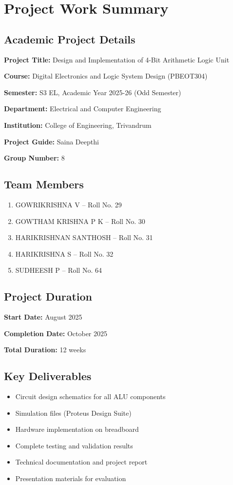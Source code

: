 \chapter*{Project Work Summary}
\thispagestyle{empty}

\section*{Academic Project Details}

\textbf{Project Title:} Design and Implementation of 4-Bit Arithmetic Logic Unit

\textbf{Course:} Digital Electronics and Logic System Design (PBEOT304)

\textbf{Semester:} S3 EL, Academic Year 2025-26 (Odd Semester)

\textbf{Department:} Electrical and Computer Engineering

\textbf{Institution:} College of Engineering, Trivandrum

\textbf{Project Guide:} Saina Deepthi

\textbf{Group Number:} 8

\section*{Team Members}

\begin{enumerate}
    \item GOWRIKRISHNA V -- Roll No. 29
    \item GOWTHAM KRISHNA P K -- Roll No. 30
    \item HARIKRISHNAN SANTHOSH -- Roll No. 31
    \item HARIKRISHNA S -- Roll No. 32
    \item SUDHEESH P -- Roll No. 64
\end{enumerate}

\section*{Project Duration}

\textbf{Start Date:} August 2025

\textbf{Completion Date:} October 2025

\textbf{Total Duration:} 12 weeks

\section*{Key Deliverables}

\begin{itemize}
    \item Circuit design schematics for all ALU components
    \item Simulation files (Proteus Design Suite)
    \item Hardware implementation on breadboard
    \item Complete testing and validation results
    \item Technical documentation and project report
    \item Presentation materials for evaluation
\end{itemize}

